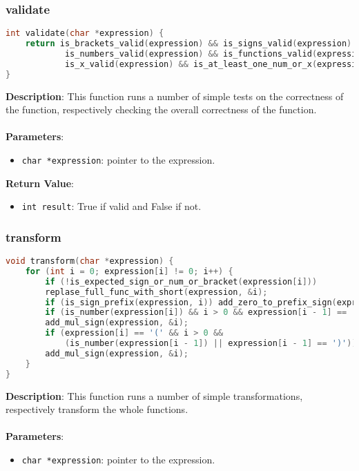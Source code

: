 \documentclass{article}
\begin{document}
\subsubsection{validate}
\begin{lstlisting}[language=C]
int validate(char *expression) {
    return is_brackets_valid(expression) && is_signs_valid(expression) &&
            is_numbers_valid(expression) && is_functions_valid(expression) &&
            is_x_valid(expression) && is_at_least_one_num_or_x(expression);
}
\end{lstlisting}
\noindent
\textbf{Description}: This function runs a number of simple tests on the correctness of the function, respectively checking the overall correctness of the function.\\\\
\textbf{Parameters}:
\begin{itemize}
    \item \texttt{char *expression}: pointer to the expression.
\end{itemize}
\textbf{Return Value}:
\begin{itemize}
    \item \texttt{int result}: True if valid and False if not.
\end{itemize}


\subsubsection{transform}
\begin{lstlisting}[language=C]
void transform(char *expression) {
    for (int i = 0; expression[i] != 0; i++) {
        if (!is_expected_sign_or_num_or_bracket(expression[i]))
        replase_full_func_with_short(expression, &i);
        if (is_sign_prefix(expression, i)) add_zero_to_prefix_sign(expression, &i);
        if (is_number(expression[i]) && i > 0 && expression[i - 1] == ')')
        add_mul_sign(expression, &i);
        if (expression[i] == '(' && i > 0 &&
            (is_number(expression[i - 1]) || expression[i - 1] == ')'))
        add_mul_sign(expression, &i);
    }
}
\end{lstlisting}
\noindent
\textbf{Description}: This function runs a number of simple transformations, respectively transform the whole functions.\\\\
\textbf{Parameters}:
\begin{itemize}
    \item \texttt{char *expression}: pointer to the expression.
\end{itemize}
\end{document}
